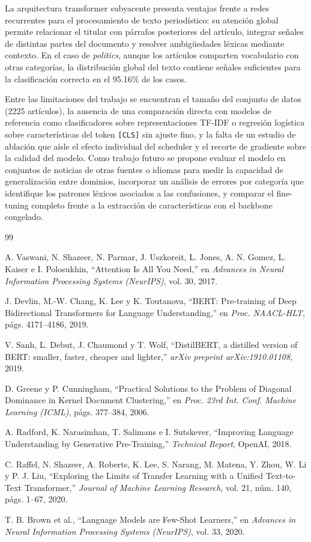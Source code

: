 \documentclass[letterpaper, 10 pt, conference]{latex_template/ieeeconf}
\begin{document}
La arquitectura transformer subyacente \cite{c1} presenta ventajas frente a redes recurrentes para el procesamiento de texto periodístico: su atención global permite relacionar el titular con párrafos posteriores del artículo, integrar señales de distintas partes del documento y resolver ambigüedades léxicas mediante contexto. En el caso de \textit{politics}, aunque los artículos comparten vocabulario con otras categorías, la distribución global del texto contiene señales suficientes para la clasificación correcta en el 95.16\% de los casos.

Entre las limitaciones del trabajo se encuentran el tamaño del conjunto de datos (2225 artículos), la ausencia de una comparación directa con modelos de referencia como clasificadores sobre representaciones TF-IDF o regresión logística sobre características del token \texttt{[CLS]} sin ajuste fino, y la falta de un estudio de ablación que aísle el efecto individual del scheduler y el recorte de gradiente sobre la calidad del modelo. Como trabajo futuro se propone evaluar el modelo en conjuntos de noticias de otras fuentes o idiomas para medir la capacidad de generalización entre dominios, incorporar un análisis de errores por categoría que identifique los patrones léxicos asociados a las confusiones, y comparar el fine-tuning completo frente a la extracción de características con el backbone congelado.

\begin{thebibliography}{99}

 A. Vaswani, N. Shazeer, N. Parmar, J. Uszkoreit, L. Jones, A. N. Gomez, L. Kaiser e I. Polosukhin, ``Attention Is All You Need,'' en \textit{Advances in Neural Information Processing Systems (NeurIPS)}, vol. 30, 2017.

 J. Devlin, M.-W. Chang, K. Lee y K. Toutanova, ``BERT: Pre-training of Deep Bidirectional Transformers for Language Understanding,'' en \textit{Proc. NAACL-HLT}, págs. 4171--4186, 2019.

 V. Sanh, L. Debut, J. Chaumond y T. Wolf, ``DistilBERT, a distilled version of BERT: smaller, faster, cheaper and lighter,'' \textit{arXiv preprint arXiv:1910.01108}, 2019.

 D. Greene y P. Cunningham, ``Practical Solutions to the Problem of Diagonal Dominance in Kernel Document Clustering,'' en \textit{Proc. 23rd Int. Conf. Machine Learning (ICML)}, págs. 377--384, 2006.

 A. Radford, K. Narasimhan, T. Salimans e I. Sutskever, ``Improving Language Understanding by Generative Pre-Training,'' \textit{Technical Report}, OpenAI, 2018.

 C. Raffel, N. Shazeer, A. Roberts, K. Lee, S. Narang, M. Matena, Y. Zhou, W. Li y P. J. Liu, ``Exploring the Limits of Transfer Learning with a Unified Text-to-Text Transformer,'' \textit{Journal of Machine Learning Research}, vol. 21, núm. 140, págs. 1--67, 2020.

 T. B. Brown et al., ``Language Models are Few-Shot Learners,'' en \textit{Advances in Neural Information Processing Systems (NeurIPS)}, vol. 33, 2020.

\end{thebibliography}
\end{document}
